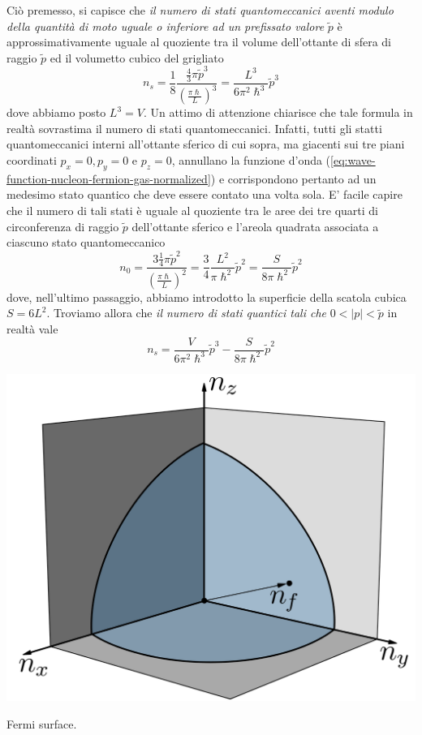 Ciò premesso, si capisce che \textit{il numero di stati quantomeccanici aventi modulo della quantità di moto uguale o inferiore ad un prefissato valore}
$\tilde{p}$ è approssimativamente uguale al quoziente tra il volume dell’ottante di sfera di raggio $\tilde{p}$ ed il volumetto cubico del grigliato
\[
n_{s} = \frac{1}{8} \frac{ \frac{4}{3} \pi \tilde{p}^{3}}{\left( \frac{\pi \hslash}{L} \right)^{3}} = \frac{L^{3}}{6 \pi^{2}\hslash^{3}}\tilde{p}^{3}
\]
dove abbiamo posto $L^{3} = V$.
Un attimo di attenzione chiarisce che tale formula in realtà sovrastima il numero di stati quantomeccanici.
Infatti, tutti gli statti quantomeccanici interni all’ottante sferico di cui sopra, ma giacenti sui tre piani coordinati $p_x=0, p_y=0$ e $p_z=0$, annullano la funzione d’onda (\ref{eq:wave-function-nucleon-fermion-gas-normalized}) e corrispondono pertanto ad un medesimo stato quantico che deve essere contato una volta sola. E’ facile capire che il numero di tali stati è uguale al quoziente tra le aree dei tre quarti di circonferenza di raggio $\tilde{p}$ dell’ottante sferico e l’areola quadrata associata a ciascuno stato quantomeccanico
\[
n_{0} = \frac{3 \frac{1}{4} \pi \tilde{p}^{2}}{\left( \frac{\pi \hslash}{L} \right)^{2}} = \frac{3}{4} \frac{L^{2}}{\pi \hslash^{2}} \tilde{p}^{2} =
\frac{S}{8\pi \hslash^{2}}\tilde{p}^{2}
\]
dove, nell’ultimo passaggio, abbiamo introdotto la superficie della scatola cubica $S = 6 L^{2}$.
Troviamo allora che \textit{ il numero di stati quantici tali che} $0< | p|<\tilde{p}$  in realtà vale
\[
n_{s} = \frac{V}{6 \pi^{2}\hslash^{3}} \tilde{p}^{3} - \frac{S}{8\pi \hslash^{2}}\tilde{p}^{2}
\]
\begin{marginfigure}
	\includegraphics{figs/Fermi-surface}
	    \caption{Fermi surface.}
\end{marginfigure}
